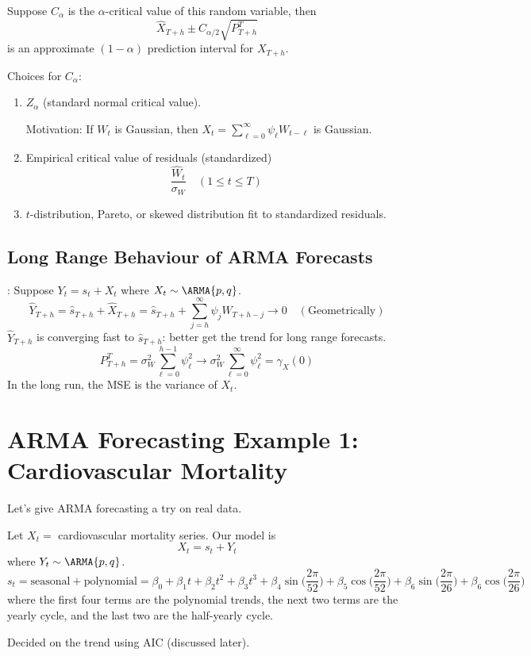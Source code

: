 Suppose $ C_\alpha $ is the $ \alpha $-critical value of this random variable,
then
\[ \hat{X}_{T+h}\pm C_{\alpha/2}\sqrt{P_{T+h}^T} \]
is an approximate $ (1-\alpha) $ prediction interval for $ X_{T+h} $.

Choices for $ C_\alpha $:
\begin{enumerate}[(1)]
    \item $ Z_\alpha $ (standard normal critical value).

          Motivation: If $ W_t $ is Gaussian, then $ X_t=\sum_{\ell=0}^{\infty} \psi_\ell W_{t-\ell} $
          is Gaussian.
    \item Empirical critical value of residuals (standardized)
          \[ \frac{\hat{W}_{t}}{\sigma_W}\quad(1\le t\le T)  \]
    \item $ t $-distribution, Pareto, or skewed distribution fit to standardized residuals.
\end{enumerate}

\subsection*{Long Range Behaviour of ARMA Forecasts}:
Suppose $ Y_t=s_t+X_t $ where $ X_t \sim \ARMA{p,q} $.
\[ \hat{Y}_{T+h}=\hat{s}_{T+h}+\hat{X}_{T+h}=\hat{s}_{T+h}+\sum_{j=h}^{\infty} \psi_j W_{T+h-j}\to 0\quad(\text{Geometrically}) \]
$ \hat{Y}_{T+h} $ is converging fast to $ \hat{s}_{T+h} $: better get the trend for
long range forecasts.
\[ P_{T+h}^T=\sigma_W^2 \sum_{\ell=0}^{h-1} \psi_\ell^2\to \sigma_W^2 \sum_{\ell=0}^{\infty} \psi_\ell^2=\gamma_X(0) \]
In the long run, the MSE is the variance of $ X_t $.

\section{ARMA Forecasting Example 1: Cardiovascular Mortality}
Let's give ARMA forecasting a try on real data.

Let $ X_t= $ cardiovascular mortality series. Our model is
\[ X_t=s_t+Y_t \]
where $ Y_t \sim \ARMA{p,q} $.
\[ s_t=\text{seasonal}+\text{polynomial}=
    \beta_0+\beta_1 t+\beta_2 t^2+\beta_3 t^3+\beta_4\sin\biggl(\frac{2\pi}{52} \biggr)
    +\beta_5\cos\biggl(\frac{2\pi}{52} \biggr)+\beta_6\sin\biggl(\frac{2\pi}{26} \biggr)
    +\beta_6\cos\biggl(\frac{2\pi}{26} \biggr) \]
where the first four terms are the polynomial trends, the next two terms
are the yearly cycle, and the last two are the half-yearly cycle.

Decided on the trend using AIC (discussed later).

